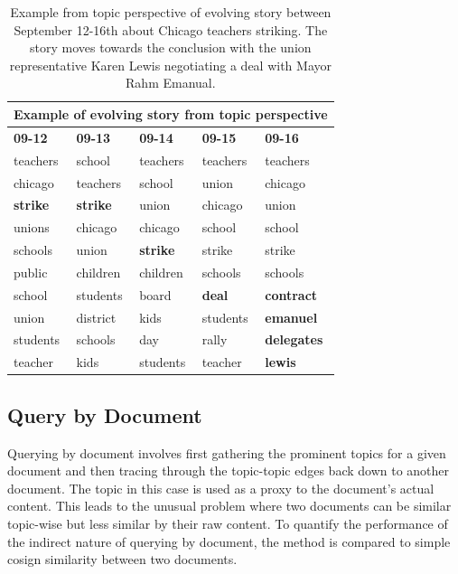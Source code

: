 \documentclass[10pt]{article}
\begin{document}
\begin{table}
\begin{center}
\begin{tabular}{|l|l|l|l|l|}
  \hline
  \multicolumn{5}{|c|}{Example of evolving story from topic perspective} \\
  \hline
  \textbf{09-12}&\textbf{09-13}&\textbf{09-14}&\textbf{09-15}&\textbf{09-16}\\
  \hline
teachers & school & teachers & teachers & teachers \\
chicago & teachers & school &  union & chicago \\
\textbf{strike} &  \textbf{strike} & union & chicago & union \\
unions &  chicago & chicago & school & school \\
schools & union &   \textbf{strike} & strike & strike \\
public & children &  children & schools & schools \\
school & students & board &   \textbf{deal} &   \textbf{contract} \\
union & district & kids & students &  \textbf{emanuel} \\
students & schools & day & rally & \textbf{delegates} \\
teacher &  kids & students & teacher & \textbf{lewis} \\
\hline
\end{tabular}
\caption{Example from topic perspective of evolving story between September 12-16th about Chicago teachers striking.  The story moves towards the conclusion with the union representative Karen Lewis negotiating a deal with Mayor Rahm Emanual. }
\end{center}
\end{table}

\subsection {Query by Document}

Querying by document involves first gathering the prominent topics for a given document and then tracing through the topic-topic edges back down to another document.  The topic in this case is used as a proxy to the document's actual content.  This leads to the unusual problem where two documents can be similar topic-wise but less similar by their raw content.  To quantify the performance of the indirect nature of querying by document, the method is compared to simple cosign similarity between two documents.  
\end{document}
